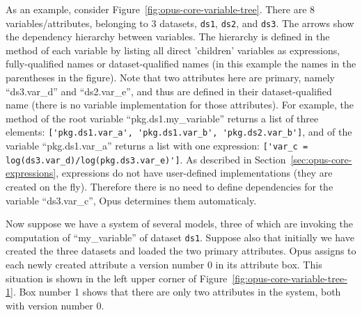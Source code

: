 {As an example, consider Figure~\ref{fig:opus-core-variable-tree}. There are 8
variables/attributes, \variablesindex\attributesindex belonging to 3 datasets, \datasetindex \verb|ds1|, \verb|ds2|, and
\verb|ds3|.  The arrows show the dependency hierarchy between variables. \variablesindex The
hierarchy is defined in the method  of each variable \variablesindex
by listing all direct 'children' variables as expressions, fully-qualified names or dataset-qualified names (in
this example the names in the parentheses in the figure). Note that two
attributes \attributesindex here are primary, namely ``ds3.var_d'' and ``ds2.var_e'', and
thus are defined in their dataset-qualified \datasetindex name (there is no variable \variablesindex
implementation for those attributes). \attributesindex For example, the  method of the root variable 
``pkg.ds1.my_variable'' returns a list of three elements: \verb|['pkg.ds1.var_a', 'pkg.ds1.var_b', 'pkg.ds2.var_b']|, 
and  of the variable ``pkg.ds1.var_a'' returns a list with one expression:
\verb|['var_c = log(ds3.var_d)/log(pkg.ds3.var_e)']|. As described in Section~\ref{sec:opus-core-expressions}, 
expressions do not have user-defined implementations (they are created on the fly). Therefore there is 
no need to define dependencies for the variable ``ds3.var_c'', Opus determines them automaticaly. 

Now suppose we have a system of several models, three of which are invoking
the computation of ``my_variable'' \variablesindex of dataset \datasetindex \verb|ds1|. Suppose also that
initially we have created the three datasets \datasetindex and loaded the two primary
attributes. \primaryattributesindex Opus assigns to each newly created attribute \attributesindex a version number 0 in
its attribute \attributesindex box.  This situation is shown in the left upper corner of
Figure~\ref{fig:opus-core-variable-tree-1}. Box number 1 shows that there are only
two attributes \attributesindex in the system, both with version number 0.

}
